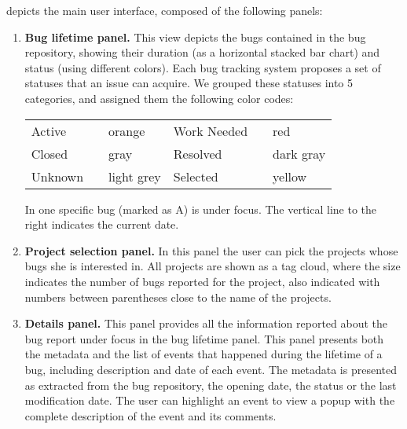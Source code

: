  depicts the main user interface, composed of the following panels:

\begin{enumerate}

\item {\bf Bug lifetime panel.} This view depicts the bugs contained in the bug repository, showing their duration (as a horizontal stacked bar chart) and status (using different colors). Each bug tracking system proposes a set of statuses that an issue can acquire. We grouped these statuses into 5 categories, and assigned them the following color codes:

\begin{center}
  {\scriptsize
  \begin{tabular}{p{1.4cm} p{0.1cm} p{1.3cm} | p{1.4cm} p{0.1cm} p{1.2cm} } \hline
  Active & \cellcolor{active} & orange & Work Needed & \cellcolor{work needed} & red \\

  Closed & \cellcolor{closed} & gray & Resolved & \cellcolor{resolved} & dark gray \\

  Unknown & \cellcolor{unknown} & light grey & Selected & \cellcolor{yellow} & yellow \\ \hline
  \end{tabular}}
\end{center}



In  one specific bug (marked as A) is under focus. The vertical line to the right indicates the current date.

\item {\bf Project selection panel.} In this panel the user can pick the projects whose bugs she is interested in. All projects are shown as a tag cloud, where the size indicates the number of bugs reported for the project, also indicated with numbers between parentheses close to the name of the projects.

\item {\bf Details panel.} This panel provides all the information reported about the bug report under focus in the bug lifetime panel. This panel presents both the metadata and the list of events that happened during the lifetime of a bug, including description and date of each event. The metadata is presented as extracted from the bug repository, \eg the opening date, the status or the last modification date. The user can highlight an event to view a popup with the complete description of the event and its comments.


\end{enumerate}
